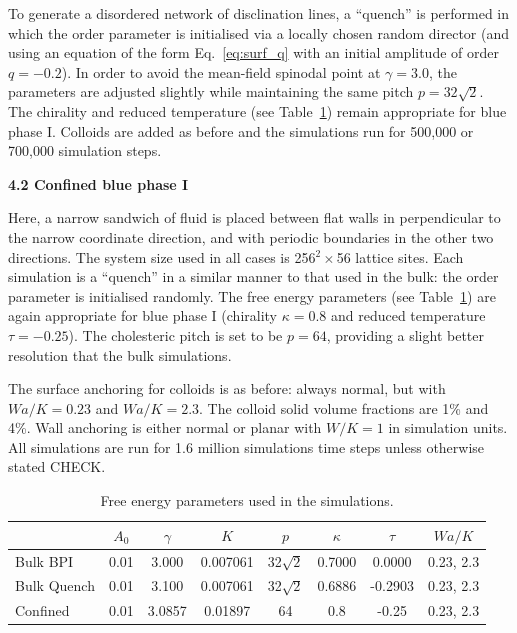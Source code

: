 \documentclass[12pt,twoside]{article}
\begin{document}
To generate a disordered network of disclination lines, a ``quench''
is performed in which the order parameter is initialised via a
locally chosen random director (and using an equation of the form
Eq.~\ref{eq:surf_q} with an initial amplitude of order $q = -0.2$).
In order to avoid the mean-field spinodal point at $\gamma = 3.0$,
the parameters are adjusted slightly while maintaining the same
pitch $p = 32\sqrt{2}$. The chirality and reduced temperature (see
Table~\ref{table:params}) remain appropriate for blue phase I.
Colloids are added
as before and the simulations run for 500,000 or 700,000 simulation
steps.


{\bf 4.2 Confined blue phase I}

Here, a narrow sandwich of fluid is placed between flat walls in
perpendicular to the narrow coordinate direction, and with periodic
boundaries in the other two directions. The system size used in all
cases is 256$^2 \times$56 lattice sites. Each simulation is a ``quench''
in a similar manner to that used in the bulk: the order parameter is
initialised randomly. The free energy parameters (see Table~\ref{table:params})
are again appropriate for blue phase I (chirality $\kappa = 0.8$ and
reduced temperature $\tau = -0.25$). The cholesteric pitch is set
to be $p = 64$, providing a slight better resolution that the bulk
simulations.

The surface anchoring for colloids is as before: always normal, but with
$Wa/K = 0.23$ and $Wa/K = 2.3$. The colloid solid volume fractions are
1\% and 4\%. Wall anchoring is either normal or planar with $W/K = 1$
in simulation units. All simulations are run for 1.6 million simulations
time steps unless otherwise stated CHECK.


\begin{table}
\begin{center}
\begin{tabular}{|l|c|c|c|c|c|c|c|}
\hline
         & $A_0$ & $\gamma$ & $K$ & $p$ & $\kappa$ & $\tau$ & $Wa/K$\\
\hline 
Bulk BPI & 0.01 & 3.000 & 0.007061 & 32$\sqrt{2}$ & 0.7000 & 0.0000 &
0.23, 2.3\\
\hline
Bulk Quench & 0.01 & 3.100 & 0.007061 & 32$\sqrt{2}$ & 0.6886 & -0.2903 &
0.23, 2.3 \\
\hline
Confined & 0.01 & 3.0857 & 0.01897 & 64 & 0.8 & -0.25 & 0.23, 2.3\\
\hline
\end{tabular}
\end{center}
\caption{Free energy parameters used in the simulations.}
\label{table:params}
\end{table}
\end{document}
